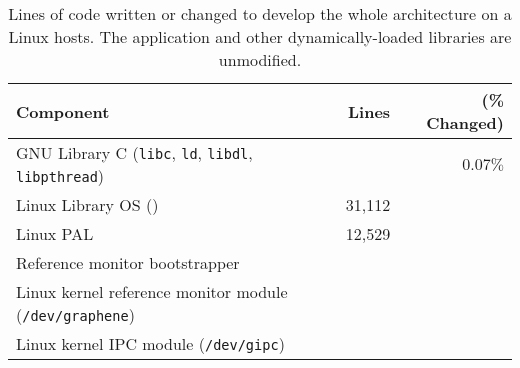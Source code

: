 \begin{table}[t!b!]
\footnotesize
\centering
\begin{tabular}{|l|rr|}
\hline
{\bf Component} & {\bf Lines} & ({\bf \% Changed})\\
\hline
GNU Library C ({\tt libc}, {\tt ld}, {\tt libdl}, {\tt libpthread}) & \libclines{} & $0.07\%$ \\
\hline
Linux Library OS (\thelibos{}) & 31,112 & \\
Linux PAL & 12,529 & \\
\hline
Reference monitor bootstrapper & {} & \\
Linux kernel reference monitor module ({\tt /dev/graphene}) & \sandboxmodlines{} & \\
Linux kernel IPC module ({\tt /dev/gipc}) & \gipclines{} & \\
\hline
\end{tabular}
\caption[Lines of code written or changed in \graphene{}]
{Lines of code written or changed to develop the whole \graphene{} architecture on a Linux hosts.  The application and other dynamically-loaded libraries are unmodified.}
\label{tab:libos:loc}
\end{table}









